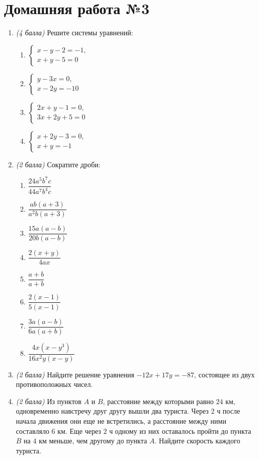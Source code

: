 \documentclass[12pt, a4paper]{article}
\begin{document}
	
	\section*{Домашняя работа №3}
	\begin{enumerate}
		\item \textit{(4 балла)} Решите системы уравнений:
			\begin{enumerate}[label=\asbuk*)]
		\item 
		$\left\{
		\begin{array}{l}
			x-y-2=-1,\\
			x+y-5=0
		\end{array}
		\right.$
		\item 
		$\left\{
		\begin{array}{l}
			y-3x=0,\\
			x-2y=-10
		\end{array}
		\right.$
		\item 
		$\left\{
		\begin{array}{l}
			2x+y-1=0,\\
			3x+2y+5=0
		\end{array}
		\right.$
		\item 
		$\left\{
		\begin{array}{l}
			x+2y-3=0,\\
			x+y=-1
		\end{array}
		\right.$ 
	\end{enumerate}
		\item \textit{(2 балла)} Сократите дроби:
		\begin{multicols}{2}
			\begin{enumerate}[label=\asbuk*)]
		\item $\dfrac{24a^5b^7c}{44a^7b^4c}$ 
		\item $\dfrac{ab(a+3)}{a^2b(a+3)}$ 
		\item $\dfrac{15a(a-b)}{20b(a-b)}$ 
		\item $\dfrac{2(x+y)}{4ax}$ 
		\item $\dfrac{a+b}{a+b}$ 
		\item $\dfrac{2(x-1)}{5(x-1)}$ 
		\item $\dfrac{3a(a-b)}{6a(a+b)}$ 
		\item $\dfrac{4x(x-y^3)}{16x^2y(x-y)}$ 
		\end{enumerate}
		\end{multicols}
		\item \textit{(2 балла)} Найдите решение уравнения $-12x+17y=-87$, состоящее из двух противоположных чисел.
		\item \textit{(2 балла)} Из пунктов $A$ и $B$, расстояние между которыми равно $24$ км, одновременно навстречу друг другу вышли два туриста. Через $2$ ч после начала движения они еще не встретились, а расстояние между ними составляло $6$ км. Еще через $2$ ч одному из них оставалось пройти до пункта $B$ на $4$ км меньше, чем другому до пункта $A$. Найдите скорость каждого туриста.
	
	\end{enumerate}
\end{document}
